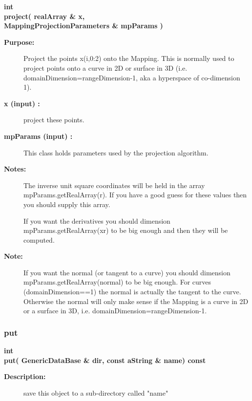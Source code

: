 \begin{flushleft} \textbf{%
int   \\ 
\settowidth{\MappingIncludeArgIndent}{project(}%
project( realArray \& x, \\ 
\hspace{\MappingIncludeArgIndent}MappingProjectionParameters \& mpParams )
}\end{flushleft}
\begin{description}
\item[{\bf Purpose:}]  
   Project the points x(i,0:2) onto the Mapping. This is normally used
 to project points onto a curve in 2D or surface in 3D (i.e. domainDimension=rangeDimension-1,
    aka a hyperspace of co-dimension 1).

\item[{\bf x (input) :}]  project these points.
\item[{\bf mpParams (input) :}]  This class holds parameters used by the projection algorithm.
    
\item[{\bf Notes:}] 
 The inverse unit square coordinates will be held in the array mpParams.getRealArray(r). If you 
  have a good guess for these values then you should supply this array.

 If you want the derivatives you should dimension mpParams.getRealArray(xr) to be big enough
 and then they will be computed.

\item[{\bf Note:}]  If you want the normal (or tangent to a curve) you should dimension mpParams.getRealArray(normal) 
 to be big enough. For curves (domainDimension==1) the normal is actually the tangent to the curve.
 Otherwise the normal will only make sense if the Mapping is a curve in 2D or a surface in 3D, i.e.
 domainDimension=rangeDimension-1.
\end{description}
\subsubsection{put}
 
\begin{flushleft} \textbf{%
int   \\ 
\settowidth{\MappingIncludeArgIndent}{put(}%
put( GenericDataBase \& dir, const aString \& name) const
}\end{flushleft}
\begin{description}
\item[{\bf Description:}] 
 save this object to a sub-directory called "name"
\end{description}
